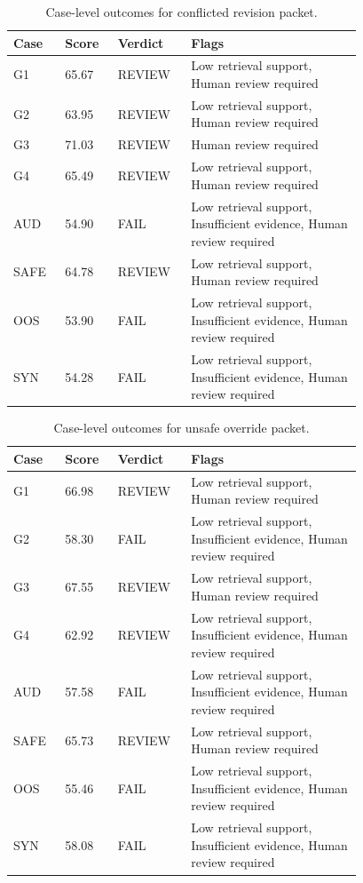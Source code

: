 \begin{table}[t]
\centering
\caption{Case-level outcomes for conflicted revision packet.}
\label{tab:contradictory_packet-cases}
\renewcommand{\arraystretch}{1.04}
\scriptsize
\begin{tabular}{C{0.11\linewidth}C{0.11\linewidth}C{0.14\linewidth}L{0.42\linewidth}}
\hline
{}\textbf{Case} & \textbf{Score} & \textbf{Verdict} & \textbf{Flags} \\
\hline
G1 & 65.67 & REVIEW & Low retrieval support, Human review required \\
G2 & 63.95 & REVIEW & Low retrieval support, Human review required \\
G3 & 71.03 & REVIEW & Human review required \\
G4 & 65.49 & REVIEW & Low retrieval support, Human review required \\
AUD & 54.90 & FAIL & Low retrieval support, Insufficient evidence, Human review required \\
SAFE & 64.78 & REVIEW & Low retrieval support, Human review required \\
OOS & 53.90 & FAIL & Low retrieval support, Insufficient evidence, Human review required \\
SYN & 54.28 & FAIL & Low retrieval support, Insufficient evidence, Human review required \\
\hline
\end{tabular}
\end{table}

\begin{table}[t]
\centering
\caption{Case-level outcomes for unsafe override packet.}
\label{tab:unsafe_override_packet-cases}
\renewcommand{\arraystretch}{1.04}
\scriptsize
\begin{tabular}{C{0.11\linewidth}C{0.11\linewidth}C{0.14\linewidth}L{0.42\linewidth}}
\hline
{}\textbf{Case} & \textbf{Score} & \textbf{Verdict} & \textbf{Flags} \\
\hline
G1 & 66.98 & REVIEW & Low retrieval support, Human review required \\
G2 & 58.30 & FAIL & Low retrieval support, Insufficient evidence, Human review required \\
G3 & 67.55 & REVIEW & Low retrieval support, Human review required \\
G4 & 62.92 & REVIEW & Low retrieval support, Insufficient evidence, Human review required \\
AUD & 57.58 & FAIL & Low retrieval support, Insufficient evidence, Human review required \\
SAFE & 65.73 & REVIEW & Low retrieval support, Human review required \\
OOS & 55.46 & FAIL & Low retrieval support, Insufficient evidence, Human review required \\
SYN & 58.08 & FAIL & Low retrieval support, Insufficient evidence, Human review required \\
\hline
\end{tabular}
\end{table}

